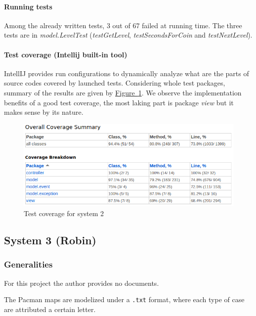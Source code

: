 \documentclass[]{article}
\newcommand{\wordlink}[2]{\hyperref[#2]{#1~\ref{#2}}}
\begin{document}
\paragraph{Running tests}

Among the already written tests, 3 out of 67 failed at running time. The three tests are in \textit{model.LevelTest} (\textit{testGetLevel}, \textit{testSecondsForCoin} and \textit{testNextLevel}). 

\paragraph{Test coverage (Intellij built-in tool)}

IntellIJ provides run configurations to dynamically analyze what are the parts of source codes covered by launched tests. Considering whole test packages, summary of the results are given by \wordlink{Figure}{fig:S2_test_coverage}. We observe the implementation benefits of a good test coverage, the most laking part is package \textit{view} but it makes sense by its nature.

\newpage

\begin{figure}[h]
\centering
\includegraphics[width=0.75\linewidth]{S2-test_coverage}
\caption{Test coverage for system 2}
\label{fig:S2_test_coverage}
\end{figure}

\newpage

\subsection{System 3 (Robin)}
\subsubsection{Generalities}

For this project the author provides no documents.

The Pacman maps are modelized under a \texttt{.txt} format, where each type of case are attributed a certain letter. 
\end{document}
